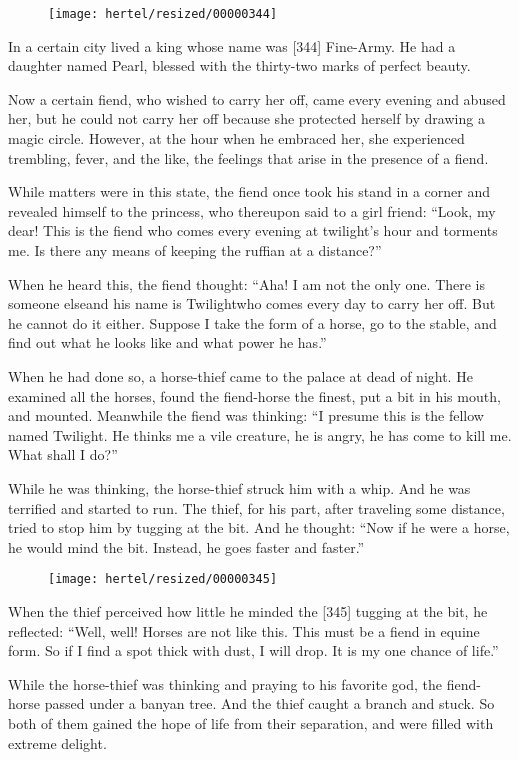 \documentclass[article, twoside, 10pt]{memoir}
\begin{document}
\begin{figure}[p]\texttt{[image: hertel/resized/00000344]}\end{figure}In a certain city lived a king whose name was [344] Fine-Army. He
had a daughter named Pearl, blessed with the thirty-two marks of
perfect beauty.

Now a certain fiend, who wished to carry her off, came every
evening and abused her, but he could not carry her off because she
protected herself by drawing a magic circle. However, at the hour
when he embraced her, she experienced trembling, fever, and the
like, the feelings that arise in the presence of a fiend.

While matters were in this state, the fiend once took his stand in
a corner and revealed himself to the princess, who thereupon said
to a girl friend:
``Look, my dear! This is the fiend who comes every evening at twilight's hour and torments me. Is there any means of keeping the ruffian at a distance?''

When he heard this, the fiend thought:
``Aha! I am not the only one. There is someone else{\textemdash}and his name is Twilight{\textemdash}who comes every day to carry her off. But he cannot do it either. Suppose I take the form of a horse, go to the stable, and find out what he looks like and what power he has.''

When he had done so, a horse-thief came to the palace at dead of
night. He examined all the horses, found the fiend-horse the
finest, put a bit in his mouth, and mounted. Meanwhile the fiend
was thinking:
``I presume this is the fellow named Twilight. He thinks me a vile creature, he is angry, he has come to kill me. What shall I do?''

While he was thinking, the horse-thief struck him with a whip. And
he was terrified and started to run. The thief, for his part, after
traveling some distance, tried to stop him by tugging at the bit.
And he thought:
``Now if he were a horse, he would mind the bit. Instead, he goes faster and faster.''

\begin{figure}[p]\texttt{[image: hertel/resized/00000345]}\end{figure}When the thief perceived how little he minded the [345] tugging at
the bit, he reflected:
``Well, well! Horses are not like this. This must be a fiend in equine form. So if I find a spot thick with dust, I will drop. It is my one chance of life.''

While the horse-thief was thinking and praying to his favorite god,
the fiend-horse passed under a banyan tree. And the thief caught a
branch and stuck. So both of them gained the hope of life from
their separation, and were filled with extreme delight.
\end{document}
